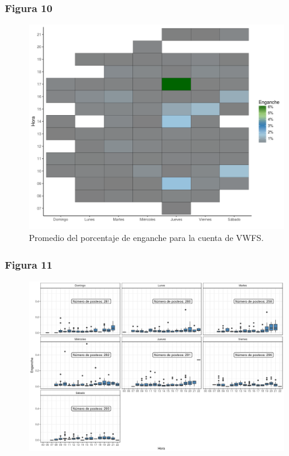 \documentclass[a4paper,10pt]{article}
\begin{document}
\subsubsection{Figura 10}
\begin{figure}[H]
  \begin{center}
   \includegraphics[width=.85\textwidth]{imagenes/figuraEnganche2.png}
      \captionsetup{width=.80\textwidth}
   \caption{\centering Promedio del porcentaje de enganche para la cuenta de VWFS.} 
  \end{center} 
\end{figure}

\subsubsection{Figura 11}
\begin{figure}[H]
  \begin{center}
   \includegraphics[width=.85\textwidth]{imagenes/engancheSeat}
      \captionsetup{width=.80\textwidth}
   \caption{\centering } 
  \end{center} 
\end{figure}
\end{document}
